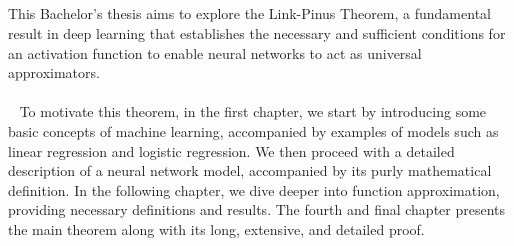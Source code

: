 \documentclass[../main.tex]{subfiles}
\begin{document}
\\ \\  \\ \\ 
This Bachelor's thesis aims to explore the Link-Pinus Theorem, a fundamental result in deep learning that establishes the necessary and sufficient conditions for an activation function to enable neural networks to act as universal approximators. 
\\ \\ 
To motivate this theorem, in the first chapter, we start by introducing some basic concepts of machine learning, accompanied by examples of models such as linear regression and logistic regression. We then proceed with a detailed description of a neural network model, accompanied by its purly mathematical definition. In the following chapter, we dive deeper into function approximation, providing necessary definitions and results. The fourth and final chapter presents the main theorem along with its long, extensive, and detailed proof.
\end{document}
